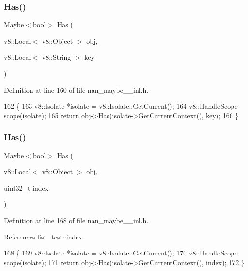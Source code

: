 \subsubsection{Has()\hspace{0.1cm}{\footnotesize\ttfamily [1/2]}}
{\footnotesize\ttfamily Maybe$<$bool$>$ Has (\begin{DoxyParamCaption}\item[{v8\+::\+Local$<$ v8\+::\+Object $>$}]{obj,  }\item[{v8\+::\+Local$<$ v8\+::\+String $>$}]{key }\end{DoxyParamCaption})}



Definition at line 160 of file nan\+\_\+maybe\+\_\+\_\+inl.\+h.


\begin{DoxyCode}
162                            \{
163   v8::Isolate *isolate = v8::Isolate::GetCurrent();
164   v8::HandleScope scope(isolate);
165   \textcolor{keywordflow}{return} obj->Has(isolate->GetCurrentContext(), key);
166 \}
\end{DoxyCode}
\mbox{\label{nan__maybe__43__inl_8h_a3ac316dd96e9d0cf70ac7bfad8adba76}} 
\subsubsection{Has()\hspace{0.1cm}{\footnotesize\ttfamily [2/2]}}
{\footnotesize\ttfamily Maybe$<$bool$>$ Has (\begin{DoxyParamCaption}\item[{v8\+::\+Local$<$ v8\+::\+Object $>$}]{obj,  }\item[{uint32\+\_\+t}]{index }\end{DoxyParamCaption})}



Definition at line 168 of file nan\+\_\+maybe\+\_\+\_\+inl.\+h.



References list\+\_\+test\+::index.


\begin{DoxyCode}
168                                                               \{
169   v8::Isolate *isolate = v8::Isolate::GetCurrent();
170   v8::HandleScope scope(isolate);
171   \textcolor{keywordflow}{return} obj->Has(isolate->GetCurrentContext(), index);
172 \}
\end{DoxyCode}
\mbox{\label{nan__maybe__43__inl_8h_afacb245a9ae8c831050f8dd2b6e15fdb}} 
